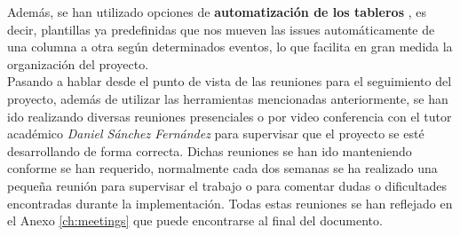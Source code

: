 Además, se han utilizado opciones de \textbf{automatización de los tableros}
\cite{automatic-project-board}, es decir, plantillas ya predefinidas que nos mueven las
issues automáticamente de una columna a otra según determinados eventos, lo que facilita
en gran medida la organización del proyecto.\\

Pasando a hablar desde el punto de vista de las reuniones para el seguimiento del proyecto,
además de utilizar las herramientas mencionadas anteriormente, se han ido realizando diversas
reuniones presenciales o por video conferencia con el tutor académico \textit{Daniel Sánchez
Fernández} para supervisar que el proyecto se esté desarrollando de forma correcta. Dichas
reuniones se han ido manteniendo conforme se han requerido, normalmente cada dos semanas se
ha realizado una pequeña reunión para supervisar el trabajo o para comentar dudas o
dificultades encontradas durante la implementación. Todas estas reuniones se han reflejado
en el Anexo \ref{ch:meetings} que puede encontrarse al final del documento.